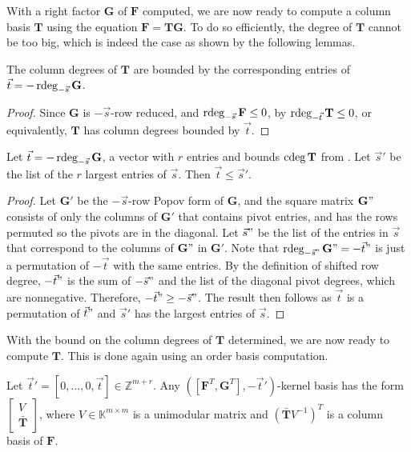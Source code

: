 With a right factor $\mathbf{G}$ of $\mathbf{F}$ computed, we are
now ready to compute a column basis $\mathbf{T}$ using the equation
$\mathbf{F}=\mathbf{T}\mathbf{G}$. To do so efficiently, the degree
of $\mathbf{T}$ cannot be too big, which is indeed the case as shown
by the following lemmas.
\begin{lem}
\label{lem:colBasisdegreeBoundByRdegOfRightFactor}The column degrees
of $\mathbf{T}$ are bounded by the corresponding entries of $\vec{t}=-\rdeg_{-\vec{s}}\mathbf{G}$.\end{lem}
\begin{proof}
Since $\mathbf{G}$ is $-\vec{s}$-row reduced, and $\rdeg_{-\vec{s}}\mathbf{F}\le0$,
by  $\rdeg_{-\vec{t}}\mathbf{T}\le0$,
or equivalently, $\mathbf{T}$ has column degrees bounded by $\vec{t}$.\end{proof}
\begin{lem}
\label{lem:colBasisDegreeBoundByInputDegrees}Let $\vec{t}=-\rdeg_{-\vec{s}}\mathbf{G}$,
a vector with $r$ entries and bounds $\cdeg\mathbf{T}$ from .
Let $\vec{s}'$ be the list of the $r$ largest entries of $\vec{s}$.
Then $\vec{t}\le\vec{s}'$.\end{lem}
\begin{proof}
Let $\mathbf{G}'$ be the $-\vec{s}$-row Popov form of $\mathbf{G}$,
and the square matrix $\mathbf{G}"$ consists of only the columns
of $\mathbf{G}'$ that contains pivot entries, and has the rows permuted
so the pivots are in the diagonal. Let $\vec{s}"$ be the list of
the entries in $\vec{s}$ that correspond to the columns of $\mathbf{G}"$
in $\mathbf{G}'$. Note that $\rdeg_{-\vec{s}"}\mathbf{G}"=-\vec{t}"$
is just a permutation of $-\vec{t}$ with the same entries. By the
definition of shifted row degree, $-\vec{t}"$ is the sum of $-\vec{s}"$
and the list of the diagonal pivot degrees, which are nonnegative.
Therefore, $-\vec{t}"\ge-\vec{s}"$. The result then follows as $\vec{t}$
is a permutation of $\vec{t}"$ and $\vec{s}'$ has the largest entries
of $\vec{s}$.
\end{proof}
With the bound on the column degrees of $\mathbf{T}$ determined,
we are now ready to compute $\mathbf{T}$. This is done again using
an order basis computation.
\begin{lem}
Let $\vec{t}'=\left[0,\dots,0,\vec{t}\right]\in\mathbb{Z}^{m+r}$.
Any $\left(\left[\mathbf{F}^{T},\mathbf{G}^{T}\right],-\vec{t}'\right)$-kernel
basis has the form $\begin{bmatrix}V\\
\bar{\mathbf{T}}
\end{bmatrix}$, where $V\in\mathbb{K}^{m\times m}$ is a unimodular matrix and $\left(\bar{\mathbf{T}}V^{-1}\right)^{T}$
is a column basis of $\mathbf{F}$.\end{lem}
